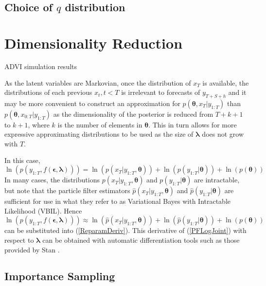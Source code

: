\documentclass[12pt,a4paper]{article}%
\numberwithin{equation}{section}
\begin{document}
\subsection{Choice of $q$ distribution}

\section{Dimensionality Reduction}

ADVI simulation results

As the latent variables are Markovian, once the distribution of $x_T$ is available, the distributions of each previous $x_t, t < T$ is irrelevant to forecasts of $y_{T+S+h}$ and it may be more convenient to construct an approximation for $p(\boldsymbol{\theta}, x_T | y_{1:T})$ than $p(\boldsymbol{\theta}, x_{0:T} | y_{1:T})$ as the dimensionality of the posterior is reduced from $T+k+1$ to $k+1$, where $k$ is the number of elements in $\boldsymbol{\theta}$. This in turn allows for more expressive approximating distributions to be used as the size of $\boldsymbol{\lambda}$ does not grow with $T$.

In this case,
\begin{equation}
\label{DimRedLogJoint}
\ln(p(y_{1:T}, f(\boldsymbol{\epsilon}, \boldsymbol{\lambda}))) = \ln(p(x_T | y_{1:T}, \boldsymbol{\theta})) + \ln(p(y_{1:T} |\boldsymbol{\theta})) + \ln(p(\boldsymbol{\theta}))
\end{equation}
In many cases, the distributions $p(x_T | y_{1:T}, \boldsymbol{\theta})$ and $p(y_{1:T} | \boldsymbol{\theta})$ are intractable, but \citet{TNK2017} note that the particle filter estimators $\hat{p}(x_T | y_{1:T}, \boldsymbol{\theta})$ and $\hat{p}(y_{1:T} | \boldsymbol{\theta})$ are sufficient for use in what they refer to as Variational Bayes with Intractable Likelihood (VBIL). Hence
\begin{equation}
\label{PFLogJoint}
\ln(p(y_{1:T}, f(\boldsymbol{\epsilon}, \boldsymbol{\lambda}))) \approx \ln(\hat{p}(x_T | y_{1:T}, \boldsymbol{\theta})) + \ln(\hat{p}(y_{1:T} |\boldsymbol{\theta})) + \ln(p(\boldsymbol{\theta}))
\end{equation}
can be substituted into (\ref{ReparamDeriv}). This derivative of (\ref{PFLogJoint}) with respect to $\boldsymbol{\lambda}$ can be obtained with automatic differentiation tools such as those provided by Stan \citep{Carpenter2015}.

\subsection{Importance Sampling}
\end{document}
